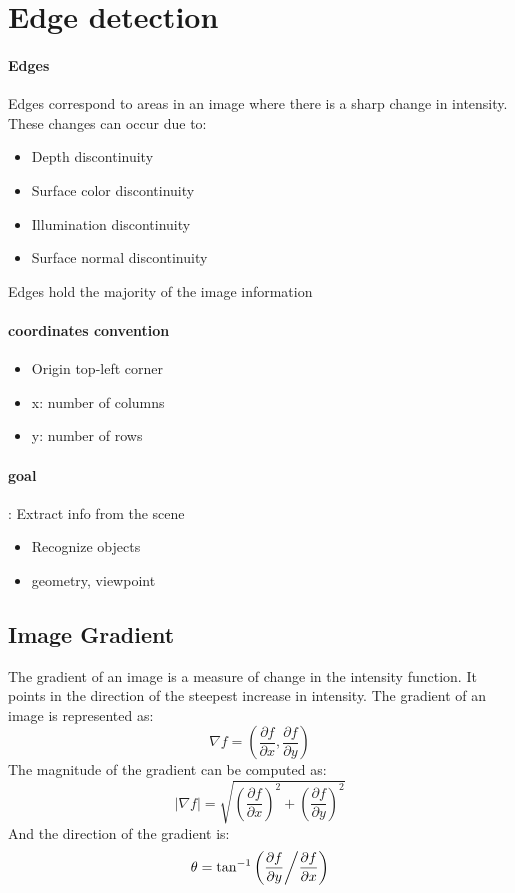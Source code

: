 \section{Edge detection}
\paragraph*{Edges}
Edges correspond to areas in an image where there is a sharp change in intensity. These changes can occur due to:
\begin{itemize}
    \item Depth discontinuity
    \item Surface color discontinuity
    \item Illumination discontinuity
    \item Surface normal discontinuity
\end{itemize}
Edges hold the majority of the image information

\paragraph*{coordinates convention}
\begin{itemize}
    \item Origin top-left corner
    \item x: number of columns
    \item y: number of rows
\end{itemize}

\paragraph*{goal}: Extract info from the scene
\begin{itemize}
    \item Recognize objects
    \item geometry, viewpoint
\end{itemize}

\subsection{Image Gradient}
The gradient of an image is a measure of change in the intensity function. It points in the direction of the steepest increase in intensity. The gradient of an image is represented as:
\[
    \nabla f = \left( \frac{\partial f}{\partial x}, \frac{\partial f}{\partial y} \right)
\]
The magnitude of the gradient can be computed as:
\[
    |\nabla f| = \sqrt{\left( \frac{\partial f}{\partial x} \right)^2 + \left( \frac{\partial f}{\partial y} \right)^2}
\]
And the direction of the gradient is:
\[
    \theta = \tan^{-1}\left( \frac{\partial f}{\partial y} \middle/ \frac{\partial f}{\partial x} \right)
\]

